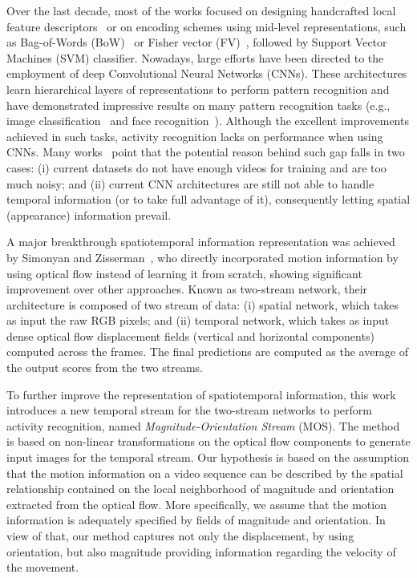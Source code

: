 \documentclass[10pt,conference]{IEEEtran}
\begin{document}
Over the last decade, most of the works focused on designing handcrafted local feature descriptors~\cite{Scovanner:2007, Laptev:2008, Klaser:2008, Wang:2011} or on encoding schemes using mid-level representations, such as Bag-of-Words (BoW)~\cite{Sivic:2003} or Fisher vector (FV)~\cite{Sanchez:2013}, followed by Support Vector Machines (SVM) classifier. Nowadays, large efforts have been directed to the employment of deep Convolutional Neural Networks (CNNs). %
These architectures learn hierarchical layers of representations to perform pattern recognition and have demonstrated impressive results on many pattern recognition tasks (e.g., image classification~\cite{Krizhevsky:2012} and face recognition~\cite{Schroff:2015}). Although the excellent improvements achieved in such tasks, activity recognition lacks on performance when using CNNs. Many works~\cite{Feichtenhofer:2016, Park:2016, Diba:2016} point that the potential reason behind such gap falls in two cases: (i) current datasets do not have enough videos for training and are too much noisy; and (ii) current CNN architectures are still not able to handle temporal information (or to take full advantage of it), consequently letting spatial (appearance) information prevail. %

A major breakthrough spatiotemporal information representation was achieved by Simonyan and Zisserman~\cite{Simonyan:2014}, who directly incorporated motion information by using optical flow instead of learning it from scratch, showing significant improvement over other approaches. Known as two-stream network, their architecture is composed of two stream of data: (i) spatial network, which takes as input the raw RGB pixels; and (ii) temporal network, which takes as input dense optical flow displacement fields (vertical and horizontal components) computed across the frames. The final predictions are computed as the average of the output scores from the two streams.

To further improve the representation of spatiotemporal information, this work introduces a new temporal stream for the two-stream networks to perform activity recognition, named \emph{Magnitude-Orientation Stream} (MOS). The method is based on non-linear transformations on the optical flow components to generate input images for the temporal stream. Our hypothesis is based on the assumption that the motion information on a video sequence can be described by the spatial relationship contained on the local neighborhood of magnitude and orientation extracted from the optical flow. More specifically, we assume that the motion information is adequately specified by fields of magnitude and orientation. In view of that, our method captures not only the displacement, by using orientation, but also magnitude providing information regarding the velocity of the movement. 
\end{document}
